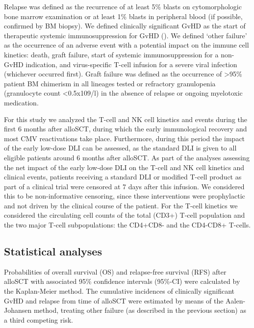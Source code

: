 \documentclass[
  letterpaper,
  paper=240mm:170mm,
  twoside=true,
  open=right,
  fontsize=10pt,
  pagesize=false,
  BCOR=15mm,
  DIV=14,
  headinclude=true,
  footinclude=false,
  headsepline=on]{scrbook}
\begin{document}
Relapse was defined as the recurrence of at least 5\% blasts on
cytomorphologic bone marrow examination or at least 1\% blasts in
peripheral blood (if possible, confirmed by BM biopsy). We defined
clinically significant GvHD as the start of therapeutic systemic
immunosuppression for GvHD
(). We defined `other failure' as the occurrence of
an adverse event with a potential impact on the immune cell kinetics:
death, graft failure, start of systemic immunosuppression for a non-GvHD
indication, and virus-specific T-cell infusion for a severe viral
infection (whichever occurred first). Graft failure was defined as the
occurrence of \textgreater95\% patient BM chimerism in all lineages
tested or refractory granulopenia (granulocyte count \textless0.5x109/l)
in the absence of relapse or ongoing myelotoxic medication.

For this study we analyzed the T-cell and NK cell kinetics and events
during the first 6 months after alloSCT, during which the early
immunological recovery and most CMV reactivations take place.
Furthermore, during this period the impact of the early low-dose DLI can
be assessed, as the standard DLI is given to all eligible patients
around 6 months after alloSCT. As part of the analyses assessing the net
impact of the early low-dose DLI on the T-cell and NK cell kinetics and
clinical events, patients receiving a standard DLI or modified T-cell
product as part of a clinical trial were censored at 7 days after this
infusion. We considered this to be non-informative censoring, since
these interventions were prophylactic and not driven by the clinical
course of the patient. For the T-cell kinetics we considered the
circulating cell counts of the total (CD3+) T-cell population and the
two major T-cell subpopulations: the CD4+CD8- and the CD4-CD8+ T-cells.

\subsection{Statistical analyses}\label{statistical-analyses}

Probabilities of overall survival (OS) and relapse-free survival (RFS)
after alloSCT with associated 95\% confidence intervals (95\%-CI) were
calculated by the Kaplan-Meier method. The cumulative incidences of
clinically significant GvHD and relapse from time of alloSCT were
estimated by means of the Aalen-Johansen method, treating other failure
(as described in the previous section) as a third competing risk.
\end{document}
